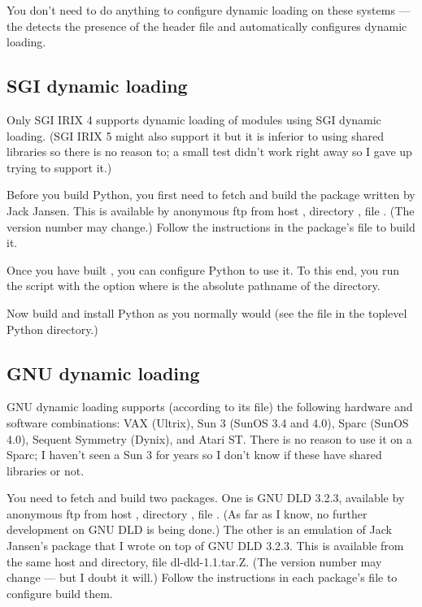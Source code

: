 You don't need to do anything to configure dynamic loading on these
systems --- the  detects the presence of the
 header file and automatically configures dynamic
loading.

\subsection{SGI dynamic loading}

Only SGI IRIX 4 supports dynamic loading of modules using SGI dynamic
loading.  (SGI IRIX 5 might also support it but it is inferior to
using shared libraries so there is no reason to; a small test didn't
work right away so I gave up trying to support it.)

Before you build Python, you first need to fetch and build the 
package written by Jack Jansen.  This is available by anonymous ftp
from host , directory , file
.  (The version number may change.)  Follow the
instructions in the package's  file to build it.

Once you have built , you can configure Python to use it.  To
this end, you run the  script with the option
 where  is the absolute
pathname of the  directory.

Now build and install Python as you normally would (see the
 file in the toplevel Python directory.)

\subsection{GNU dynamic loading}

GNU dynamic loading supports (according to its  file) the
following hardware and software combinations: VAX (Ultrix), Sun 3
(SunOS 3.4 and 4.0), Sparc (SunOS 4.0), Sequent Symmetry (Dynix), and
Atari ST.  There is no reason to use it on a Sparc; I haven't seen a
Sun 3 for years so I don't know if these have shared libraries or not.

You need to fetch and build two packages.  One is GNU DLD 3.2.3,
available by anonymous ftp from host , directory
, file .  (As far as I know,
no further development on GNU DLD is being done.)  The other is an
emulation of Jack Jansen's  package that I wrote on top of
GNU DLD 3.2.3.  This is available from the same host and directory,
file dl-dld-1.1.tar.Z.  (The version number may change --- but I doubt
it will.)  Follow the instructions in each package's 
file to configure build them.

